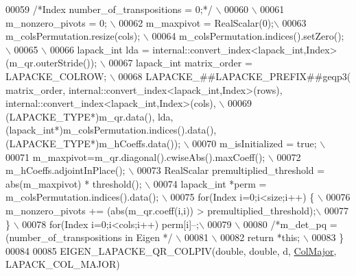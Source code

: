 \begin{DoxyCode}
00059 \textcolor{preprocessor}{  }\textcolor{comment}{/*Index number\_of\_transpositions = 0;*/}\textcolor{preprocessor}{ \(\backslash\)}
00060 \textcolor{preprocessor}{\(\backslash\)}
00061 \textcolor{preprocessor}{  m\_nonzero\_pivots = 0; \(\backslash\)}
00062 \textcolor{preprocessor}{  m\_maxpivot = RealScalar(0);\(\backslash\)}
00063 \textcolor{preprocessor}{  m\_colsPermutation.resize(cols); \(\backslash\)}
00064 \textcolor{preprocessor}{  m\_colsPermutation.indices().setZero(); \(\backslash\)}
00065 \textcolor{preprocessor}{\(\backslash\)}
00066 \textcolor{preprocessor}{  lapack\_int lda = internal::convert\_index<lapack\_int,Index>(m\_qr.outerStride()); \(\backslash\)}
00067 \textcolor{preprocessor}{  lapack\_int matrix\_order = LAPACKE\_COLROW; \(\backslash\)}
00068 \textcolor{preprocessor}{  LAPACKE\_##LAPACKE\_PREFIX##geqp3( matrix\_order, internal::convert\_index<lapack\_int,Index>(rows),
       internal::convert\_index<lapack\_int,Index>(cols), \(\backslash\)}
00069 \textcolor{preprocessor}{                              (LAPACKE\_TYPE*)m\_qr.data(), lda,
       (lapack\_int*)m\_colsPermutation.indices().data(), (LAPACKE\_TYPE*)m\_hCoeffs.data()); \(\backslash\)}
00070 \textcolor{preprocessor}{  m\_isInitialized = true; \(\backslash\)}
00071 \textcolor{preprocessor}{  m\_maxpivot=m\_qr.diagonal().cwiseAbs().maxCoeff(); \(\backslash\)}
00072 \textcolor{preprocessor}{  m\_hCoeffs.adjointInPlace(); \(\backslash\)}
00073 \textcolor{preprocessor}{  RealScalar premultiplied\_threshold = abs(m\_maxpivot) * threshold(); \(\backslash\)}
00074 \textcolor{preprocessor}{  lapack\_int *perm = m\_colsPermutation.indices().data(); \(\backslash\)}
00075 \textcolor{preprocessor}{  for(Index i=0;i<size;i++) \{ \(\backslash\)}
00076 \textcolor{preprocessor}{    m\_nonzero\_pivots += (abs(m\_qr.coeff(i,i)) > premultiplied\_threshold);\(\backslash\)}
00077 \textcolor{preprocessor}{  \} \(\backslash\)}
00078 \textcolor{preprocessor}{  for(Index i=0;i<cols;i++) perm[i]--;\(\backslash\)}
00079 \textcolor{preprocessor}{\(\backslash\)}
00080 \textcolor{preprocessor}{  }\textcolor{comment}{/*m\_det\_pq = (number\_of\_transpositions%
       in Eigen */}\textcolor{preprocessor}{ \(\backslash\)}
00081 \textcolor{preprocessor}{\(\backslash\)}
00082 \textcolor{preprocessor}{  return *this; \(\backslash\)}
00083 \textcolor{preprocessor}{\}}
00084 
00085 EIGEN\_LAPACKE\_QR\_COLPIV(\textcolor{keywordtype}{double},   \textcolor{keywordtype}{double},        d, \hyperlink{group__enums_ggaacded1a18ae58b0f554751f6cdf9eb13a0cbd4bdd0abcfc0224c5fcb5e4f6669a}{ColMajor}, LAPACK\_COL\_MAJOR)

\end{DoxyCode}
